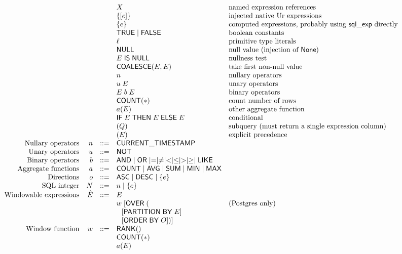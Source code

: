 \documentclass{article}
\newcommand{\mt}[1]{\mathsf{#1}}
\begin{document}
$$\begin{array}{rrcll}
  &&& X & \textrm{named expression references} \\
  &&& \{[e]\} & \textrm{injected native Ur expressions} \\
  &&& \{e\} & \textrm{computed expressions, probably using $\mt{sql\_exp}$ directly} \\
  &&& \mt{TRUE} \mid \mt{FALSE} & \textrm{boolean constants} \\
  &&& \ell & \textrm{primitive type literals} \\
  &&& \mt{NULL} & \textrm{null value (injection of $\mt{None}$)} \\
  &&& E \; \mt{IS} \; \mt{NULL} & \textrm{nullness test} \\
  &&& \mt{COALESCE}(E, E) & \textrm{take first non-null value} \\
  &&& n & \textrm{nullary operators} \\
  &&& u \; E & \textrm{unary operators} \\
  &&& E \; b \; E & \textrm{binary operators} \\
  &&& \mt{COUNT}(\ast) & \textrm{count number of rows} \\
  &&& a(E) & \textrm{other aggregate function} \\
  &&& \mt{IF} \; E \; \mt{THEN} \; E \; \mt{ELSE} \; E & \textrm{conditional} \\
  &&& (Q) & \textrm{subquery (must return a single expression column)} \\
  &&& (E) & \textrm{explicit precedence} \\
  \textrm{Nullary operators} & n &::=& \mt{CURRENT\_TIMESTAMP} \\
  \textrm{Unary operators} & u &::=& \mt{NOT} \\
  \textrm{Binary operators} & b &::=& \mt{AND} \mid \mt{OR} \mid = \mid \neq \mid < \mid \leq \mid > \mid \geq \mid \mt{LIKE} \\
  \textrm{Aggregate functions} & a &::=& \mt{COUNT} \mid \mt{AVG} \mid \mt{SUM} \mid \mt{MIN} \mid \mt{MAX} \\
  \textrm{Directions} & o &::=& \mt{ASC} \mid \mt{DESC} \mid \{e\} \\
  \textrm{SQL integer} & N &::=& n \mid \{e\} \\
  \textrm{Windowable expressions} & \hat{E} &::=& E \\
  &&& w \; [\mt{OVER} \; ( & \textrm{(Postgres only)} \\
  &&& \hspace{.1in} [\mt{PARTITION} \; \mt{BY} \; E] \\
  &&& \hspace{.1in} [\mt{ORDER} \; \mt{BY} \; O])] \\
  \textrm{Window function} & w &::=& \mt{RANK}() \\
  &&& \mt{COUNT}(*) \\
  &&& a(E)
\end{array}$$
\end{document}
